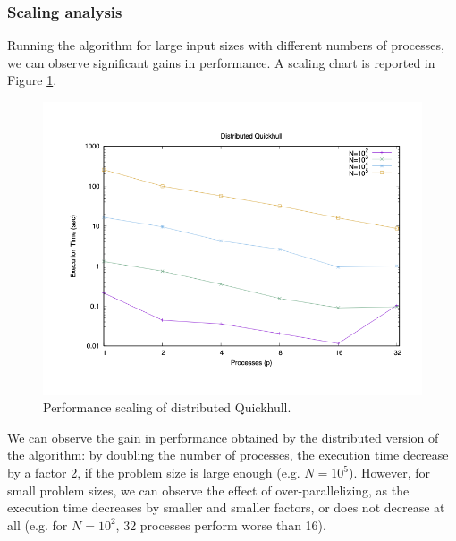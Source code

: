\documentclass[]{finalproject}
\begin{document}
\subsubsection{Scaling analysis}
Running the algorithm for large input sizes with different numbers of processes, we can observe significant gains in performance.
A scaling chart is reported in Figure \ref{fig:qh-scaling}.
\begin{figure}[H]
\centering
\includegraphics[width=0.5\linewidth]{gpStrongTime.png}
\caption{Performance scaling of distributed Quickhull.}
\label{fig:qh-scaling}
\end{figure}

We can observe the gain in performance obtained by the distributed version of the algorithm:
by doubling the number of processes, the execution time decrease by a factor 2, if the problem size is large enough (e.g. $N=10^5$).
However, for small problem sizes, we can observe the effect of over-parallelizing,
as the execution time decreases by smaller and smaller factors, or does not decrease at all
(e.g. for $N=10^2$, 32 processes perform worse than 16).

\clearpage


\end{document}
